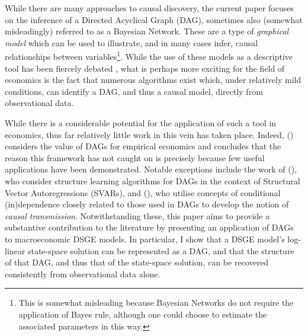 \documentclass{article}
\begin{document}
While there are many approaches to causal discovery, the current paper focuses on the inference of a Directed Acyclical Graph (DAG), sometimes also (somewhat misleadingly) referred to as a Bayesian Network. These are a type of \textit{graphical model} which can be used to illustrate, and in many cases infer, causal relationships between variables\footnote{This is somewhat misleading because Bayesian Networks do not require the application of Bayes rule, although one could choose to estimate the associated parameters in this way.}. While the use of these models as a descriptive tool has been fiercely debated \parencite{pearl2018book}, what is perhaps more exciting for the field of economics is the fact that numerous algorithms exist which, under relatively mild conditions, can identify a DAG, and thus a causal model, directly from observational data.

While there is a considerable potential for the application of such a tool in economics, thus far relatively little work in this vein has taken place. Indeed, \citeauthor{imbens2019potential} (\citeyear{imbens2019potential}) considers the value of DAGs for empirical economics and concludes that the reason this framework has not caught on is precisely because few useful applications have been demonstrated. Notable exceptions include the work of \citeauthor{demiralp2003searching} (\citeyear{demiralp2003searching}), who consider structure learning algorithms for DAGs in the context of Structural Vector Autoregressions (SVARs), and \citeauthor{bazinas2015causal} (\citeyear{bazinas2015causal}), who utilise concepts of conditional (in)dependence closely related to those used in DAGs to develop the notion of \textit{causal transmission}. Notwithstanding these, this paper aims to provide a substantive contribution to the literature by presenting an application of DAGs to macroeconomic DSGE models. In particular, I show that a DSGE model's log-linear state-space solution can be represented as a DAG, and that the structure of that DAG, and thus that of the state-space solution, can be recovered consistently from observational data alone. 
\end{document}
